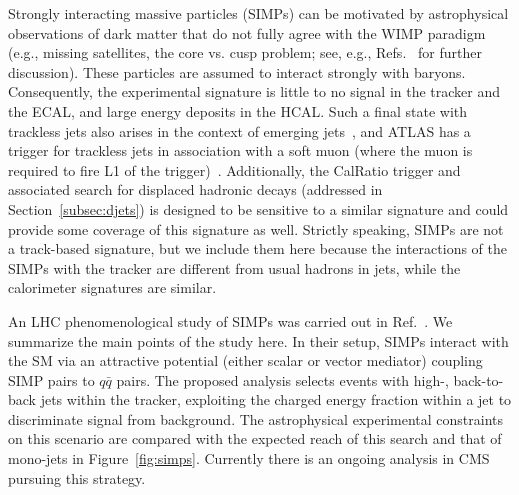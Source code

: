 Strongly interacting massive particles (SIMPs) can be motivated by astrophysical observations of dark matter that do not fully agree with the WIMP paradigm (e.g., missing satellites, the core vs. cusp problem; see, e.g., Refs.~\cite{2010arXiv1009.4505B,2011MNRAS.415L..40B,Weinberg:2013aya,1742-6596-437-1-012001} for further discussion). These particles are assumed to interact strongly with baryons. Consequently, the experimental signature is little to no signal in the tracker and the ECAL, and large energy deposits in the HCAL. Such a final state with trackless jets also arises in the context of emerging jets~\cite{Schwaller:2015gea}, and ATLAS has a trigger for trackless jets in association with a soft muon (where the muon is required to fire L1 of the trigger)~\cite{ATLASLLPTriggers}.%
Additionally, the CalRatio trigger and associated search for displaced hadronic decays (addressed in Section~\ref{subsec:djets}) is designed to be sensitive to a similar signature and could provide some coverage of this signature as well. Strictly speaking, SIMPs are not a track-based signature, but we include them here because the interactions of the SIMPs with the tracker are different from usual hadrons in jets, while the calorimeter signatures are similar.

An LHC phenomenological study of SIMPs was carried out in Ref.~\cite{Daci:2015hca}. We summarize the main points of the study here. In their setup, SIMPs interact with the SM via an attractive potential (either scalar or vector mediator) coupling SIMP pairs to $q\bar{q}$ pairs. The proposed analysis selects events with high-\pT, back-to-back jets within the tracker, exploiting the charged energy fraction within a jet to discriminate signal from background. The astrophysical experimental constraints on this scenario are compared with the expected reach of this search and that of mono-jets in Figure~\ref{fig:simps}. Currently there is an ongoing analysis in CMS pursuing this strategy.

